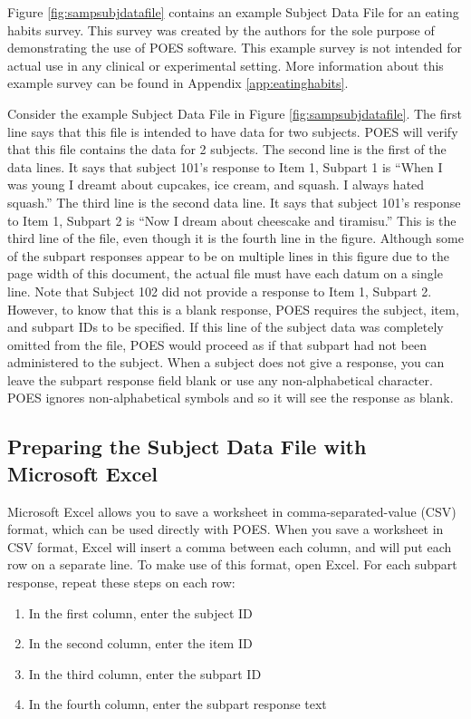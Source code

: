 \documentclass[11pt]{article}
\numberwithin{figure}{section}
\numberwithin{table}{section}
\begin{document}
Figure  \ref{fig:sampsubjdatafile} contains an example Subject Data File for an eating habits survey.  This survey was created by the authors for the sole purpose of demonstrating the use of POES software.  This example survey is not intended for actual use in any clinical or experimental setting.  More information about this example survey can be found in Appendix \ref{app:eatinghabits}.
 
Consider the example Subject Data File in Figure \ref{fig:sampsubjdatafile}.
The first line says that this file is intended to have data for two subjects.  POES will verify that this file contains the data for 2 subjects.
The second line is the first of the data lines.  It says that subject 101's response to Item 1, Subpart 1 is ``When I was young I dreamt about cupcakes, ice cream, and squash.  I always hated squash.''
The third line is the second data line.  It says that subject 101's response to Item 1, Subpart 2 is ``Now I dream about cheescake and tiramisu.''  This is the third line of the file, even though it is the fourth line in the figure.  Although some of the subpart responses appear to be on multiple lines in this figure due to the page width of this document, the actual file must have each datum on a single line.  
Note that Subject 102 did not provide a response to Item 1, Subpart 2.  However, to know that this is a blank response, POES requires the subject, item, and subpart IDs to be specified. If this line of the subject data was completely omitted from the file, POES would proceed as if that subpart had not been administered to the subject.  When a subject does not give a response, you can leave the subpart response field blank or use any non-alphabetical character.  POES ignores non-alphabetical symbols and so it will see the response as blank. 

 
\subsection{Preparing the Subject Data File with Microsoft Excel}
\label{sec:subjdataexcel}

Microsoft Excel allows you to save a worksheet in comma-separated-value (CSV) format, which can be used directly with POES.  When you save a worksheet in CSV format, Excel will insert a comma between each column, and will put each row on a separate line.  To make use of this format, open Excel.  For each subpart response, repeat these steps on each row:
\begin{enumerate}
\item In the first column, enter the subject ID
\item In the second column, enter the item ID
\item In the third column, enter the subpart ID
\item In the fourth column, enter the subpart response text
\end{enumerate}
\end{document}
